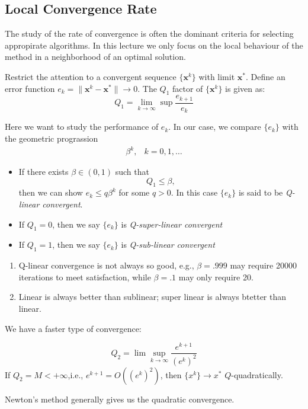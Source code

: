 \subsection{Local Convergence Rate}
The study of the rate of convergence is often the dominant criteria for selecting appropirate algorithms. In this lecture we only focus on the local behaviour of the method in a neighborhood of an optimal solution.
\begin{definition}[$Q_1$ Factor]
Restrict the attention to a convergent sequence $\{\bm x^k\}$ with limit $\bm x^*$. Define an error function $e_k=\|\bm x^k-\bm x^*\|\to0$. The $Q_1$ factor of $\{\bm x^k\}$ is given as:
\[
Q_1 = \lim_{k\to\infty}\sup\frac{e_{k+1}}{e_k}
\]
\end{definition}
Here we want to study the performance of $e_k$. In our case, we compare $\{e_k\}$ with the geometric prograssion
\[
\begin{array}{ll}
\beta^k,
&
k=0,1,\dots
\end{array}
\]
\begin{itemize}
\item
If there exists $\beta\in(0,1)$ such that
\[
Q_1\le \beta,
\]
then we can show $e_k\le q\beta^k$ for some $q>0$. In this case $\{e_k\}$ is said to be \emph{Q-linear convergent}.
\item
If $Q_1=0$, then we say $\{e_k\}$ is \emph{Q-super-linear convergent}
\item
If $Q_1=1$, then we say $\{e_k\}$ is \emph{Q-sub-linear convergent}
\end{itemize}

\begin{remark}
\begin{enumerate}
\item
Q-linear convergence is not always so good, e.g., $\beta=.999$ may require 20000 iterations to meet satisfaction, while $\beta=.1$ may only require 20.
\item
Linear is always better than sublinear; super linear is always btetter than linear.
\end{enumerate}
\end{remark}

We have a faster type of convergence:
\begin{definition}[$Q_2$ Factor]
\[
Q_2 = \lim\sup_{k\to\infty}\frac{e^{k+1}}{(e^k)^2}
\]
If $Q_2=M<+\infty$,i.e., $e^{k+1}=O((e^k)^2)$, then $\{x^k\}\to x^*$ $Q$-quadratically.
\end{definition}
Newton's method generally gives us the quadratic convergence.

